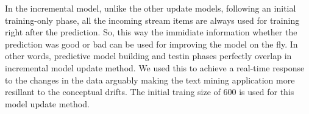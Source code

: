 \begin{center} In the incremental model, unlike the other update models, following an initial training-only phase, all the incoming stream items are always used for training right after the prediction. So, this way the immidiate information whether the prediction was good or bad can be used for improving the model on the fly. In other words, predictive model building and testin phases perfectly overlap in incremental model update method. We used this to achieve a real-time response to the changes in the data arguably making the text mining application more resillant to the conceptual drifts. The initial traing size of 600 is used for this model update method.\end{center}
